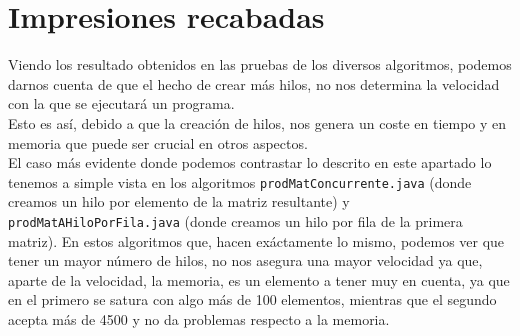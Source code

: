 \documentclass[12pt,letterpaper]{article}
\begin{document}
\newpage
\section{Impresiones recabadas}
\noindent
Viendo los resultado obtenidos en las pruebas de los diversos algoritmos, podemos darnos cuenta de que el hecho de crear más hilos, no nos determina la velocidad con la que se ejecutará un programa.\\
Esto es así, debido a que la creación de hilos, nos genera un coste en tiempo y en memoria que puede ser crucial en otros aspectos.\\
El caso más evidente donde podemos contrastar lo descrito en este apartado lo tenemos a simple vista en los algoritmos \texttt{prodMatConcurrente.java} (donde creamos un hilo por elemento de la matriz resultante) y \texttt{prodMatAHiloPorFila.java} (donde creamos un hilo por fila de la primera matriz). En estos algoritmos que, hacen exáctamente lo mismo, podemos ver que tener un mayor número de hilos, no nos asegura una mayor velocidad ya que, aparte de la velocidad, la memoria, es un elemento a tener muy en cuenta, ya que en el primero se satura con algo más de 100 elementos, mientras que el segundo acepta más de 4500 y no da problemas respecto a la memoria.
\end{document}
